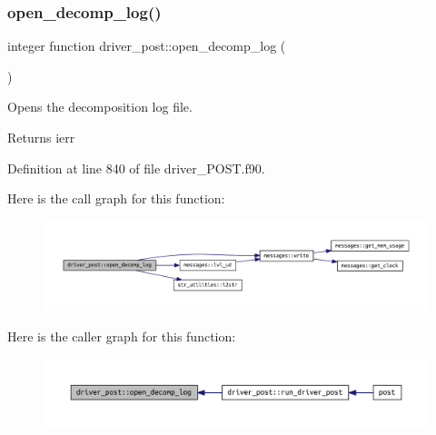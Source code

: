 \mbox{\label{namespacedriver__post_a5d76f87f131e21b4d74fd5f4a7bbbd6b}} 
\subsubsection{\texorpdfstring{open\+\_\+decomp\+\_\+log()}{open\_decomp\_log()}}
{\footnotesize\ttfamily integer function driver\+\_\+post\+::open\+\_\+decomp\+\_\+log (\begin{DoxyParamCaption}{ }\end{DoxyParamCaption})}



Opens the decomposition log file. 

\begin{DoxyReturn}{Returns}
ierr 
\end{DoxyReturn}


Definition at line 840 of file driver\+\_\+\+P\+O\+S\+T.\+f90.

Here is the call graph for this function\+:\nopagebreak
\begin{figure}[H]
\begin{center}
\leavevmode
\includegraphics[width=350pt]{namespacedriver__post_a5d76f87f131e21b4d74fd5f4a7bbbd6b_cgraph}
\end{center}
\end{figure}
Here is the caller graph for this function\+:\nopagebreak
\begin{figure}[H]
\begin{center}
\leavevmode
\includegraphics[width=350pt]{namespacedriver__post_a5d76f87f131e21b4d74fd5f4a7bbbd6b_icgraph}
\end{center}
\end{figure}
\mbox{\label{namespacedriver__post_af9ce961d2d6825b767a93fdbe8806a1c}} 
